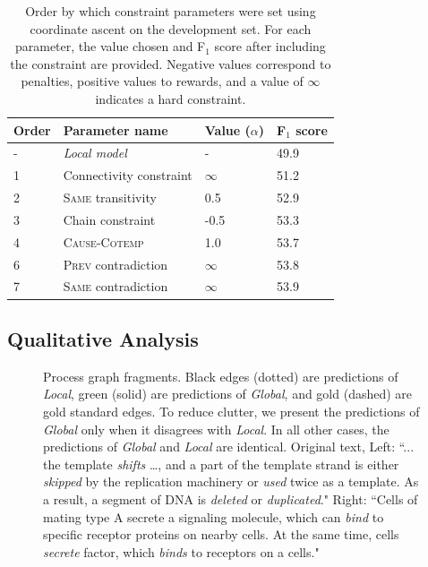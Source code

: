 \begin{table}[t]
{\footnotesize
\begin{tabular}{ l | l | l | l }
    \textbf{Order} & \textbf{Parameter name} & \textbf{Value} ($\alpha$)& \textbf{F$_1$ score} \\
\hline
- & \emph{Local model} & - & 49.9 \\
1 & Connectivity constraint & $\infty$ & 51.2 \\
2 & \textsc{Same} transitivity &  0.5 & 52.9 \\
3 & Chain constraint & -0.5 & 53.3\\
4 & \textsc{Cause}-\textsc{Cotemp} & 1.0 & 53.7\\
6 & \textsc{Prev} contradiction & $\infty$ & 53.8\\
7 & \textsc{Same} contradiction & $\infty$ & 53.9
\end{tabular}}
\caption{Order by which constraint parameters were set using coordinate ascent on the development set. For each parameter, the value chosen and F$_1$ score after including the constraint are provided. Negative values correspond to penalties, positive values to rewards, and a value of $\infty$ indicates a hard constraint.}
\label{tab:paramtuning}
\end{table}

\subsection{Qualitative Analysis} \label{subsec:analysis}
\begin{figure}[t]
\centering
{}
\caption{Process graph fragments. Black edges (dotted) are predictions of \emph{Local}, green (solid) are predictions of \emph{Global}, and gold (dashed) are gold standard edges. To reduce clutter, we present the predictions of \emph{Global} only when it disagrees with \emph{Local}. In all other cases, the predictions of \emph{Global} and \emph{Local} are identical. Original text, Left: ``... the template \emph{shifts} \ldots, and a part of the template strand is either \emph{skipped} by the replication machinery or \emph{used} twice as a template.
As a result, a segment of DNA is \emph{deleted} or \emph{duplicated}." Right: ``Cells of mating type A secrete a signaling molecule, which can \emph{bind} to specific receptor proteins on nearby cells. At the same time, cells \emph{secrete} factor, which \emph{binds} to receptors on a cells."}
\label{fig:graph}
\end{figure}

